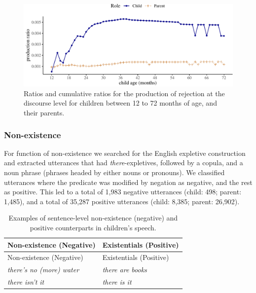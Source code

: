 \documentclass[
  english,
  man,floatsintext]{apa6}
\begin{document}
\begin{figure}[H]

{\centering \includegraphics{neg_construction_article_files/figure-latex/emotiondiscourse-1} 

}

\caption{Ratios and cumulative ratios for the production of rejection at the discourse level for children between 12 to 72 months of age, and their parents.}\label{fig:emotiondiscourse}
\end{figure}

\hypertarget{non-existence}{%
\subsubsection{Non-existence}\label{non-existence}}

For function of non-existence we searched for the English expletive construction and extracted utterances that had \emph{there}-expletives, followed by a copula, and a noun phrase (phrases headed by either nouns or pronouns). We classified utterances where the predicate was modified by negation as negative, and the rest as positive. This led to a total of 1,983 negative utterances (child: 498; parent: 1,485), and a total of 35,287 positive utterances (child: 8,385; parent: 26,902).

\begin{longtable}[]{@{}ll@{}}
\caption{\label{tab:nonexist} Examples of sentence-level non-existence (negative) and positive counterparts in children's speech.}\tabularnewline
\toprule
Non-existence (Negative) & Existentials (Positive) \\
\midrule
\endfirsthead
\toprule
Non-existence (Negative) & Existentials (Positive) \\
\midrule
\endhead
\emph{there's no (more) water} & \emph{there are books} \\
\emph{there isn't it} & \emph{there is it} \\
\bottomrule
\end{longtable}
\end{document}

